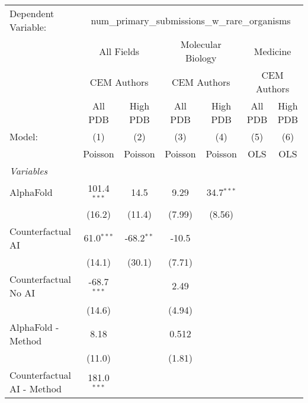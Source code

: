 \begingroup
\centering
\begin{tabular}{lcccccc}
   \tabularnewline \midrule \midrule
   Dependent Variable: & \multicolumn{6}{c}{num\_primary\_submissions\_w\_rare\_organisms}\\
 & \multicolumn{2}{c}{All Fields} & \multicolumn{2}{c}{Molecular Biology} & \multicolumn{2}{c}{Medicine} \\
\cmidrule(lr){2-3} \cmidrule(lr){4-5} \cmidrule(lr){6-7}
 & \multicolumn{2}{c}{CEM Authors} & \multicolumn{2}{c}{CEM Authors} & \multicolumn{2}{c}{CEM Authors} \\
\cmidrule(lr){2-3} \cmidrule(lr){4-5} \cmidrule(lr){6-7}
 & \multicolumn{1}{c}{All PDB} & \multicolumn{1}{c}{High PDB} & \multicolumn{1}{c}{All PDB} & \multicolumn{1}{c}{High PDB} & \multicolumn{1}{c}{All PDB} & \multicolumn{1}{c}{High PDB} \\
\cmidrule(lr){2-2} \cmidrule(lr){3-3} \cmidrule(lr){4-4} \cmidrule(lr){5-5} \cmidrule(lr){6-6} \cmidrule(lr){7-7}
   Model:                        & (1)           & (2)          & (3)     & (4)          & (5)  & (6)\\  
                                 &  Poisson      & Poisson      & Poisson & Poisson      & OLS  & OLS\\  
   \midrule
   \emph{Variables}\\
   AlphaFold                     & 101.4$^{***}$ & 14.5         & 9.29    & 34.7$^{***}$ &      &   \\   
                                 & (16.2)        & (11.4)       & (7.99)  & (8.56)       &      &   \\   
   Counterfactual AI             & 61.0$^{***}$  & -68.2$^{**}$ & -10.5   &              &      &   \\   
                                 & (14.1)        & (30.1)       & (7.71)  &              &      &   \\   
   Counterfactual No AI          & -68.7$^{***}$ &              & 2.49    &              &      &   \\   
                                 & (14.6)        &              & (4.94)  &              &      &   \\   
   AlphaFold - Method            & 8.18          &              & 0.512   &              &      &   \\   
                                 & (11.0)        &              & (1.81)  &              &      &   \\   
   Counterfactual AI - Method    & 181.0$^{***}$ &              &         &              &      &   \\   

\end{tabular}
